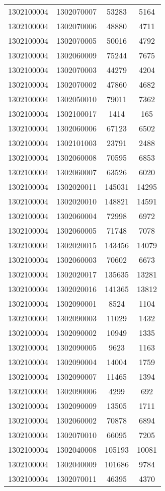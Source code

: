 \begin{longtable}{llcc}
1302100004 & 1302070007 & 53283 & 5164\\
1302100004 & 1302070006 & 48880 & 4711\\
1302100004 & 1302070005 & 50016 & 4792\\
1302100004 & 1302060009 & 75244 & 7675\\
1302100004 & 1302070003 & 44279 & 4204\\
1302100004 & 1302070002 & 47860 & 4682\\
1302100004 & 1302050010 & 79011 & 7362\\
1302100004 & 1302100017 & 1414 & 165\\
1302100004 & 1302060006 & 67123 & 6502\\
1302100004 & 1302101003 & 23791 & 2488\\
1302100004 & 1302060008 & 70595 & 6853\\
1302100004 & 1302060007 & 63526 & 6020\\
1302100004 & 1302020011 & 145031 & 14295\\
1302100004 & 1302020010 & 148821 & 14591\\
1302100004 & 1302060004 & 72998 & 6972\\
1302100004 & 1302060005 & 71748 & 7078\\
1302100004 & 1302020015 & 143456 & 14079\\
1302100004 & 1302060003 & 70602 & 6673\\
1302100004 & 1302020017 & 135635 & 13281\\
1302100004 & 1302020016 & 141365 & 13812\\
1302100004 & 1302090001 & 8524 & 1104\\
1302100004 & 1302090003 & 11029 & 1432\\
1302100004 & 1302090002 & 10949 & 1335\\
1302100004 & 1302090005 & 9623 & 1163\\
1302100004 & 1302090004 & 14004 & 1759\\
1302100004 & 1302090007 & 11465 & 1394\\
1302100004 & 1302090006 & 4299 & 692\\
1302100004 & 1302090009 & 13505 & 1711\\
1302100004 & 1302060002 & 70878 & 6894\\
1302100004 & 1302070010 & 66095 & 7205\\
1302100004 & 1302040008 & 105193 & 10081\\
1302100004 & 1302040009 & 101686 & 9784\\
1302100004 & 1302070011 & 46395 & 4370\\

\end{longtable}
